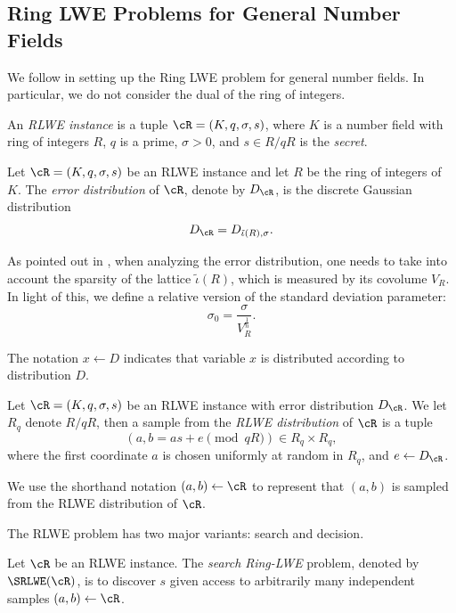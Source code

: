 \documentclass[envcountsect]{llncs}
\begin{document}
\subsection{Ring LWE Problems for General Number Fields}

We follow \cite{elos2015weak} in setting up the Ring LWE problem for general number fields.  In particular, we do not consider the dual of the ring of integers. 

\begin{definition}
An {\it RLWE instance} is a tuple $\cR = (K,q,\sigma,s)$, where $K$ is a number field with ring of integers $R$, $q$ is a prime, $\sigma >0$, and $s \in R/qR$ is the {\it secret}.
\end{definition}


\begin{definition}
Let $\cR = (K,q,\sigma,s)$ be an RLWE instance and let $R$ be the ring of integers of $K$. The {\it error distribution} of $\cR$, denote by $D_\cR$, is the discrete Gaussian distribution
\[
D_\cR = D_{\tilde{\iota}(R),\sigma}.
\]
\end{definition}

As pointed out in \cite{elos2015weak}, when analyzing the error distribution, one needs to take into account the sparsity of the lattice $\tilde{\iota}(R)$, which is measured by its covolume $V_R$. In light of this, we define a relative version of the standard deviation parameter: $$\sigma_0 = \frac{\sigma}{V_R^{\frac{1}{n}}}.$$

The notation $x \gets D$ indicates that variable $x$ is distributed according to distribution $D$.

\begin{definition}
Let $\cR = (K,q,\sigma, s)$ be an RLWE instance with error distribution $D_\cR$. We let $R_q$ denote $R/qR$, then
a sample from the {\it RLWE distribution} of $\cR$ is a tuple
$$(a, b = as+e\pmod{qR}) \in R_q \times R_q, $$
where the first coordinate $a$ is chosen uniformly at random in $R_q$, and $e \gets D_\cR$.
\end{definition}

We use the shorthand notation $(a,b) \gets \cR$ to represent that $(a,b)$ is sampled from the RLWE distribution of $\cR$. 

The RLWE problem has two major variants: search and decision.

\begin{definition}
Let $\cR$ be an RLWE instance. The {\it search Ring-LWE} problem, denoted by $\SRLWE(\cR)$, is to discover $s$ given access to arbitrarily many independent samples $(a,b) \gets \cR$.
\end{definition}
\end{document}
